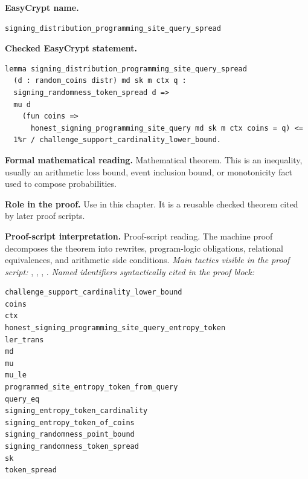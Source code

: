 \begin{formaltheorem}
\noindent\textbf{EasyCrypt name.}
\begin{lstlisting}[language=EasyCrypt,basicstyle=\ttfamily\scriptsize]
signing_distribution_programming_site_query_spread
\end{lstlisting}
\noindent\textbf{Checked EasyCrypt statement.}
\begin{lstlisting}[language=EasyCrypt,basicstyle=\ttfamily\scriptsize]
lemma signing_distribution_programming_site_query_spread
  (d : random_coins distr) md sk m ctx q :
  signing_randomness_token_spread d =>
  mu d
    (fun coins =>
      honest_signing_programming_site_query md sk m ctx coins = q) <=
  1%r / challenge_support_cardinality_lower_bound.
\end{lstlisting}
\noindent\textbf{Formal mathematical reading.}
Mathematical theorem. This is an inequality, usually an arithmetic loss bound, event inclusion bound, or monotonicity fact used to compose probabilities.

\noindent\textbf{Role in the proof.}
Use in this chapter. It is a reusable checked theorem cited by later proof scripts.

\noindent\textbf{Proof-script interpretation.}
Proof-script reading. The machine proof decomposes the theorem into rewrites, program-logic obligations, relational equivalences, and arithmetic side conditions.
\emph{Main tactics visible in the proof script:} , , , .
\emph{Named identifiers syntactically cited in the proof block:}
\begin{lstlisting}[language=EasyCrypt,basicstyle=\ttfamily\scriptsize]
challenge_support_cardinality_lower_bound
coins
ctx
honest_signing_programming_site_query_entropy_token
ler_trans
md
mu
mu_le
programmed_site_entropy_token_from_query
query_eq
signing_entropy_token_cardinality
signing_entropy_token_of_coins
signing_randomness_point_bound
signing_randomness_token_spread
sk
token_spread
\end{lstlisting}

\end{formaltheorem}

